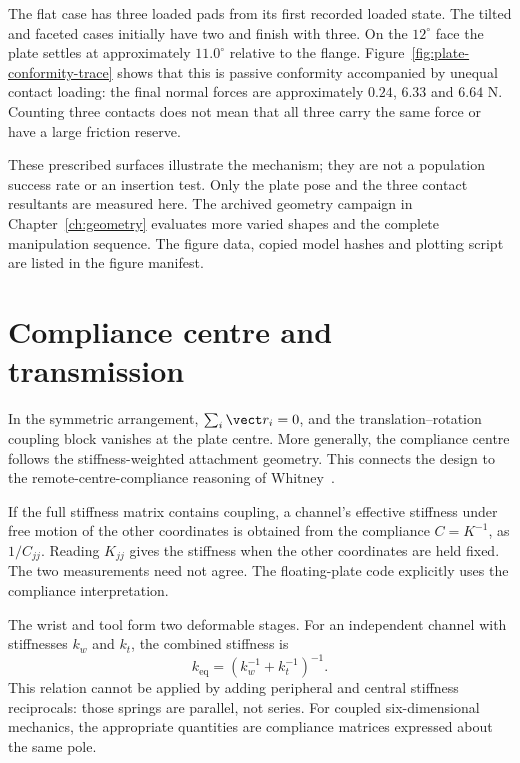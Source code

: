 The flat case has three loaded pads from its first recorded loaded state. The tilted and faceted cases initially have two and finish with three. On the $12^\circ$ face the plate settles at approximately $11.0^\circ$ relative to the flange. Figure~\ref{fig:plate-conformity-trace} shows that this is passive conformity accompanied by unequal contact loading: the final normal forces are approximately $0.24$, $6.33$ and $6.64$ N. Counting three contacts does not mean that all three carry the same force or have a large friction reserve.


These prescribed surfaces illustrate the mechanism; they are not a population success rate or an insertion test. Only the plate pose and the three contact resultants are measured here. The archived geometry campaign in Chapter~\ref{ch:geometry} evaluates more varied shapes and the complete manipulation sequence. The figure data, copied model hashes and plotting script are listed in the figure manifest.


\section{Compliance centre and transmission}

In the symmetric arrangement, $\sum_i\vect r_i=0$, and the translation--rotation coupling block vanishes at the plate centre. More generally, the compliance centre follows the stiffness-weighted attachment geometry. This connects the design to the remote-centre-compliance reasoning of Whitney~\cite{whitney1982}.

If the full stiffness matrix contains coupling, a channel's effective stiffness under free motion of the other coordinates is obtained from the compliance $C=K^{-1}$, as $1/C_{jj}$. Reading $K_{jj}$ gives the stiffness when the other coordinates are held fixed. The two measurements need not agree. The floating-plate code explicitly uses the compliance interpretation.

The wrist and tool form two deformable stages. For an independent channel with stiffnesses $k_w$ and $k_t$, the combined stiffness is
\begin{equation}
k_{\mathrm{eq}}=\left(k_w^{-1}+k_t^{-1}\right)^{-1}.
\end{equation}
This relation cannot be applied by adding peripheral and central stiffness reciprocals: those springs are parallel, not series. For coupled six-dimensional mechanics, the appropriate quantities are compliance matrices expressed about the same pole.

